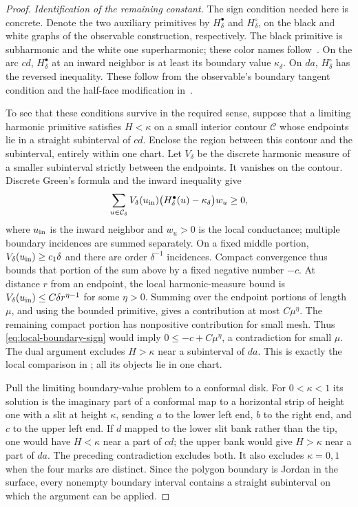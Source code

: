 \begin{proof}
\emph{Identification of the remaining constant.}
The sign condition needed here is concrete. Denote the two auxiliary
primitives by $H_\delta^\bullet$ and $H_\delta^\circ$, on the black
and white graphs of the observable construction, respectively. The
black primitive is subharmonic and the white one superharmonic;
these color names follow~\cite{CS}. On the arc $cd$,
$H_\delta^\bullet$ at an inward neighbor is at least its boundary
value $\kappa_\delta$. On $da$, $H_\delta^\circ$ has the reversed inequality.
These follow from the observable's boundary tangent condition and the
half-face modification in~\cite[Section~6]{CS}.

To see that these conditions survive in the required sense, suppose
that a limiting harmonic primitive satisfies $H<\kappa$ on a small
interior contour $\mathcal C$ whose endpoints lie in a straight
subinterval of $cd$. Enclose the region between this contour and the
subinterval, entirely within one chart. Let $V_\delta$ be the discrete
harmonic measure of a smaller subinterval strictly between the endpoints.
It vanishes on the contour. Discrete Green's formula and the inward
inequality give
\begin{equation}\label{eq:local-boundary-sign}
 \sum_{u\in\mathcal C_\delta}
       V_\delta(u_{\rm in})
       \bigl(H_\delta^\bullet(u)-\kappa_\delta\bigr)w_u\ge0,
\end{equation}
where $u_{\rm in}$ is the inward neighbor and $w_u>0$ is the local
conductance; multiple boundary incidences are summed separately.
On a fixed middle portion, $V_\delta(u_{\rm in})\ge c_1\delta$ and
there are order $\delta^{-1}$ incidences. Compact convergence thus
bounds that portion of the sum above by a fixed negative number $-c$.
At distance $r$ from an endpoint, the local harmonic-measure bound is
$V_\delta(u_{\rm in})\le C\delta r^{\eta-1}$ for some $\eta>0$.
Summing over the endpoint portions of length $\mu$, and using the
bounded primitive, gives a contribution at most $C\mu^\eta$.
The remaining compact portion has nonpositive contribution for small
mesh. Thus \eqref{eq:local-boundary-sign}
would imply $0\le-c+C\mu^\eta$, a contradiction for small $\mu$.
The dual argument excludes $H>\kappa$ near a subinterval of $da$.
This is exactly the local comparison in
\cite[Equations~(6.8)--(6.10)]{CS}; all its objects lie in one chart.

Pull the limiting boundary-value problem to a conformal disk.
For $0<\kappa<1$ its solution is the imaginary part of a conformal
map to a horizontal strip of height one with a slit at height $\kappa$,
sending $a$ to the lower left end, $b$ to the right end, and $c$ to the
upper left end. If $d$ mapped to the lower slit bank rather than the
tip, one would have $H<\kappa$ near a part of $cd$; the upper bank
would give $H>\kappa$ near a part of $da$. The preceding contradiction
excludes both. It also excludes $\kappa=0,1$ when the four marks are
distinct. Since the polygon boundary is Jordan in the surface, every
nonempty boundary interval contains a straight subinterval on which
the argument can be applied.


\end{proof}
